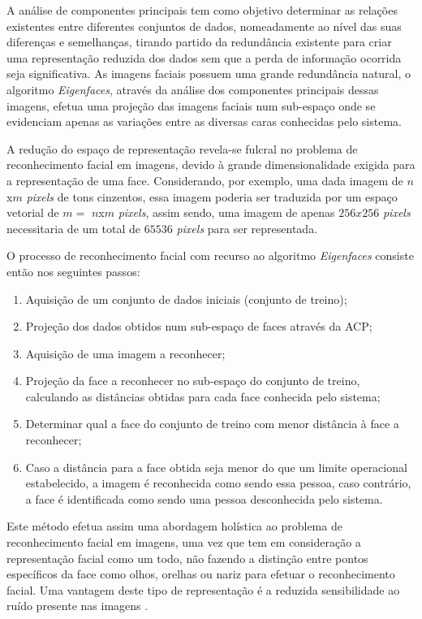 A análise de componentes principais tem como objetivo determinar as relações existentes entre diferentes conjuntos de dados, nomeadamente ao nível das suas diferenças e semelhanças, tirando partido da redundância existente para criar uma representação reduzida dos dados sem que a perda de informação ocorrida seja significativa. As imagens faciais possuem uma grande redundância natural, o algoritmo \textit{Eigenfaces}, através da análise dos componentes principais dessas imagens, efetua uma projeção das imagens faciais num sub-espaço onde se evidenciam apenas as variações entre as diversas caras conhecidas pelo sistema.

A redução do espaço de representação revela-se fulcral no problema de reconhecimento facial em imagens, devido à grande dimensionalidade exigida para a representação de uma face. Considerando, por exemplo, uma dada imagem de $n$x$m$ \textit{pixels} de tons cinzentos, essa imagem poderia ser traduzida por um espaço vetorial de $m = $ $n$x$m$ \textit{pixels}, assim sendo, uma imagem de apenas $256x256$ \textit{pixels} necessitaria de um total de $65536$ \textit{pixels} para ser representada.

O processo de reconhecimento facial com recurso ao algoritmo \textit{Eigenfaces} consiste então nos seguintes passos:
\begin{enumerate}
\item Aquisição de um conjunto de dados iniciais (conjunto de treino);
\item Projeção dos dados obtidos num sub-espaço de faces através da ACP;
\item Aquisição de uma imagem a reconhecer;
\item Projeção da face a reconhecer no sub-espaço do conjunto de treino, calculando as distâncias obtidas para cada face conhecida pelo sistema;
\item Determinar qual a face do conjunto de treino com menor distância à face a reconhecer;
\item Caso a distância para a face obtida seja menor do que um limite operacional estabelecido, a imagem é reconhecida como sendo essa pessoa, caso contrário, a face é identificada como sendo uma pessoa desconhecida pelo sistema.
\end{enumerate}

Este método efetua assim uma abordagem holística ao problema de reconhecimento facial em imagens, uma vez que tem em consideração a representação facial como um todo, não fazendo a distinção entre pontos específicos da face como olhos, orelhas ou nariz para efetuar o reconhecimento facial. Uma vantagem deste tipo de representação é a reduzida sensibilidade ao ruído presente nas imagens \cite{Zhao2003}.

